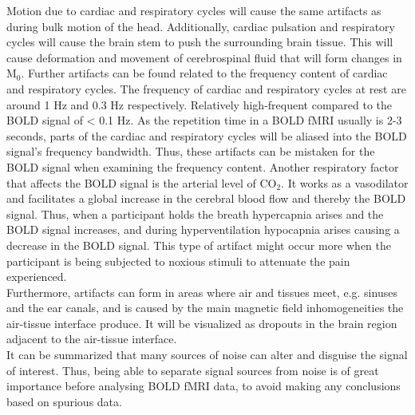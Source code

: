 Motion due to cardiac and respiratory cycles will cause the same artifacts as during bulk motion of the head. Additionally, cardiac pulsation and respiratory cycles will cause the brain stem to push the surrounding brain tissue. This will cause deformation and movement of cerebrospinal fluid that will form changes in M$_0$. Further artifacts can be found related to the frequency content of cardiac and respiratory cycles. The frequency of cardiac and respiratory cycles at rest are around 1 Hz and 0.3 Hz respectively. Relatively high-frequent compared to the BOLD signal of < 0.1 Hz. As the repetition time in a BOLD fMRI usually is 2-3 seconds, parts of the cardiac and respiratory cycles will be aliased into the BOLD signal’s frequency bandwidth. Thus, these artifacts can be mistaken for the BOLD signal when examining the frequency content. Another respiratory factor that affects the BOLD signal is the arterial level of CO$_2$. It works as a vasodilator and facilitates a global increase in the cerebral blood flow and thereby the BOLD signal. Thus, when a participant holds the breath hypercapnia arises and the BOLD signal increases, and during hyperventilation hypocapnia arises causing a decrease in the BOLD signal.  \cite{Murphy2013} This type of artifact might occur more when the participant is being subjected to noxious stimuli to attenuate the pain experienced. \cite{Poldrack2011}  \\
Furthermore, artifacts can form in areas where air and tissues meet, e.g. sinuses and the ear canals, and is caused by the main magnetic field inhomogeneities the air-tissue interface produce. It will be visualized as dropouts in the brain region adjacent to the air-tissue interface. \cite{Poldrack2011} \\
It can be summarized that many sources of noise can alter and disguise the signal of interest. Thus, being able to separate signal sources from noise is of great importance before analysing BOLD fMRI data, to avoid making any conclusions based on spurious data.



